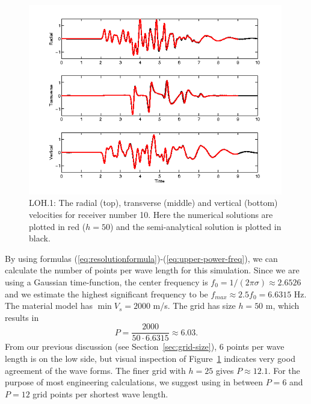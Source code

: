 \documentclass[11pt]{report}
\begin{document}
\begin{figure}[ht]
  \begin{center}
    \includegraphics[width=0.99\textwidth]{figures/LOH1.png}
    \caption{LOH.1: The radial (top), transverse (middle) and vertical (bottom) velocities for
      receiver number 10. Here the numerical solutions are plotted in red ($h=50$) and the semi-analytical solution is plotted in black.}
    \label{fig:LOH1}
  \end{center}
\end{figure}

By using formulas (\ref{eq:resolutionformula})-(\ref{eq:upper-power-freq}), we can calculate the
number of points per wave length for this simulation. Since we are using a Gaussian time-function,
the center frequency is $f_0=1/(2\pi\sigma)\approx 2.6526$ and we estimate the highest significant
frequency to be $f_{max}\approx 2.5 f_0 = 6.6315$ Hz. The material model has $\min V_s = 2000$
m/s. The grid has size $h=50$ m, which results in
\[
P = \dfrac{2000}{50\cdot 6.6315} \approx 6.03.
\]
From our previous discussion (see Section~\ref{sec:grid-size}), 6 points per wave length is on the
low side, but visual inspection of Figure~\ref{fig:LOH1} indicates very good agreement of the wave
forms. The finer grid with $h=25$ gives $P\approx 12.1$. For the purpose of most engineering
calculations, we suggest using in between $P=6$ and $P=12$ grid points per shortest wave length.
\end{document}
